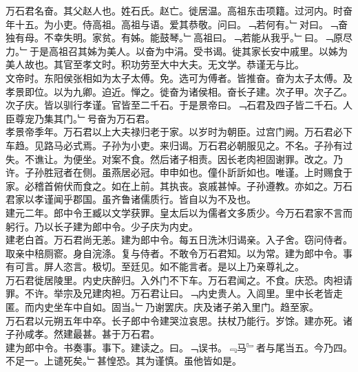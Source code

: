 \documentclass{zhvt-classic}
\begin{document}

\hspace*{2em}万石君名奋。其父赵人也。姓石氏。赵亡。徙居温。高祖东击项籍。过河内。时奋年十五。为小吏。侍高祖。高祖与语。爱其恭敬。问曰。﹁若何有。﹂对曰。﹁奋独有母。不幸失明。家贫。有姊。能鼓琴。﹂高祖曰。﹁若能从我乎。﹂曰。﹁原尽力。﹂于是高祖召其姊为美人。以奋为中涓。受书谒。徙其家长安中戚里。以姊为美人故也。其官至孝文时。积功劳至大中大夫。无文学。恭谨无与比。\\
\hspace*{2em}文帝时。东阳侯张相如为太子太傅。免。选可为傅者。皆推奋。奋为太子太傅。及孝景即位。以为九卿。迫近。惮之。徙奋为诸侯相。奋长子建。次子甲。次子乙。次子庆。皆以驯行孝谨。官皆至二千石。于是景帝曰。﹁石君及四子皆二千石。人臣尊宠乃集其门。﹂号奋为万石君。\\
\hspace*{2em}孝景帝季年。万石君以上大夫禄归老于家。以岁时为朝臣。过宫门阙。万石君必下车趋。见路马必式焉。子孙为小吏。来归谒。万石君必朝服见之。不名。子孙有过失。不谯让。为便坐。对案不食。然后诸子相责。因长老肉袒固谢罪。改之。乃许。子孙胜冠者在侧。虽燕居必冠。申申如也。僮仆訢訢如也。唯谨。上时赐食于家。必稽首俯伏而食之。如在上前。其执丧。哀戚甚悼。子孙遵教。亦如之。万石君家以孝谨闻乎郡国。虽齐鲁诸儒质行。皆自以为不及也。\\
\hspace*{2em}建元二年。郎中令王臧以文学获罪。皇太后以为儒者文多质少。今万石君家不言而躬行。乃以长子建为郎中令。少子庆为内史。\\
\hspace*{2em}建老白首。万石君尚无恙。建为郎中令。每五日洗沐归谒亲。入子舍。窃问侍者。取亲中稖厕窬。身自浣涤。复与侍者。不敢令万石君知。以为常。建为郎中令。事有可言。屏人恣言。极切。至廷见。如不能言者。是以上乃亲尊礼之。\\
\hspace*{2em}万石君徙居陵里。内史庆醉归。入外门不下车。万石君闻之。不食。庆恐。肉袒请罪。不许。举宗及兄建肉袒。万石君让曰。﹁内史贵人。入闾里。里中长老皆走匿。而内史坐车中自如。固当。﹂乃谢罢庆。庆及诸子弟入里门。趋至家。\\
\hspace*{2em}万石君以元朔五年中卒。长子郎中令建哭泣哀思。扶杖乃能行。岁馀。建亦死。诸子孙咸孝。然建最甚。甚于万石君。\\
\hspace*{2em}建为郎中令。书奏事。事下。建读之。曰。﹁误书。﹃马﹄者与尾当五。今乃四。不足一。上谴死矣。﹂甚惶恐。其为谨慎。虽他皆如是。\\
\end{document}
